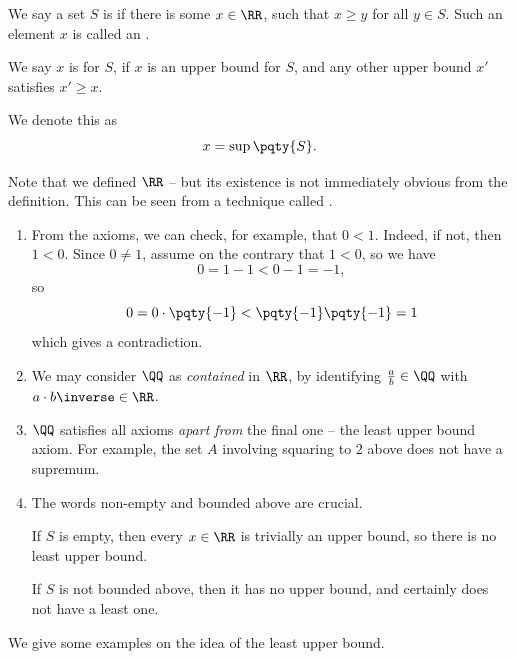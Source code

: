 \begin{definition}
    We say a set \(S\) is  if there is some \(x \in \RR\), such that \(x \geq y\) for all \(y \in S\). Such an element \(x\) is called an .

    We say \(x\) is  for \(S\), if \(x\) is an upper bound for \(S\), and any other upper bound \(x'\) satisfies \(x' \geq x\).

    We denote this as
    \[
        x = \sup\pqty{S}.
    \]
\end{definition}

Note that we defined \(\RR\) -- but its existence is not immediately obvious from the definition. This can be seen from a technique called .

\begin{remarks}
    \begin{enumerate}
        \item From the axioms, we can check, for example, that \(0 < 1\). Indeed, if not, then \(1 < 0\). Since \(0 \neq 1\), assume on the contrary that \(1 < 0\), so we have
        \[
            0 = 1 - 1 < 0 - 1 = -1,
        \]
        so
        \[
            0 = 0 \cdot \pqty{-1} < \pqty{-1} \pqty{-1} = 1
        \]
        which gives a contradiction.
        \item We may consider \(\QQ\) as \emph{contained} in \(\RR\), by identifying \(\frac{a}{b} \in \QQ\) with \(a \cdot b\inverse \in \RR\).
        \item \(\QQ\) satisfies all axioms \emph{apart from} the final one -- the least upper bound axiom. For example, the set \(A\) involving squaring to \(2\) above does not have a supremum.
        \item The words non-empty and bounded above are crucial.
        
        If \(S\) is empty, then every \(x \in \RR\) is trivially an upper bound, so there is no least upper bound.

        If \(S\) is not bounded above, then it has no upper bound, and certainly does not have a least one.
    \end{enumerate}
\end{remarks}

We give some examples on the idea of the least upper bound.

